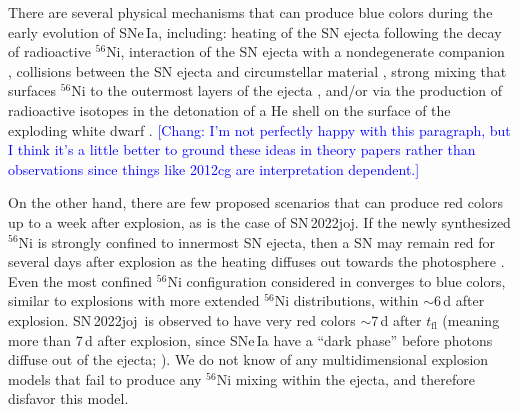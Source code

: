 \documentclass[twocolumn]{aastex631}
\newcommand{\sn}{SN\,2022joj}
\newcommand{\chang}[1]{\textcolor{blue}{[Chang: #1]}}
\begin{document}
\begin{CJK*}{UTF8}{gbsn}
There are several physical mechanisms that can produce blue colors during the early evolution of SNe\,Ia, including: heating of the SN ejecta following the decay of radioactive $^{56}$Ni, interaction of the SN ejecta with a nondegenerate companion \citep{Kasen_2010}, collisions between the SN ejecta and circumstellar material \citep[e.g.,][]{Piro_2016}, strong mixing that surfaces $^{56}$Ni to the outermost layers of the ejecta \citep[e.g.,][]{Piro_2013,Magee_2020}, and/or via the production of radioactive isotopes in the detonation of a He shell on the surface of the exploding white dwarf \citep[e.g.,][]{polin_observational_2019}. \chang{I'm not perfectly happy with this paragraph, but I think it's a little better to ground these ideas in theory papers rather than observations since things like 2012cg are interpretation dependent.}


On the other hand, there are few proposed scenarios that can produce red colors up to a week after explosion, as is the case of \sn. If the newly synthesized $^{56}$Ni is strongly confined to innermost SN ejecta, then a SN may remain red for several days after explosion as the heating diffuses out towards the photosphere \citep{Piro_2016}. Even the most confined $^{56}$Ni configuration considered in \citet{Piro_2016} converges to blue colors, similar to explosions with more extended $^{56}$Ni distributions, within $\sim$6\,d after explosion. \sn\ is observed to have very red colors $\sim$7\,d after $t_\mathrm{fl}$ (meaning more than 7\,d after explosion, since SNe\,Ia have a ``dark phase'' before photons diffuse out of the ejecta; \citealt{Piro_2013}). We do not know of any multidimensional explosion models that fail to produce any $^{56}$Ni mixing within the ejecta, and therefore disfavor this model.


\end{CJK*}
\end{document}
